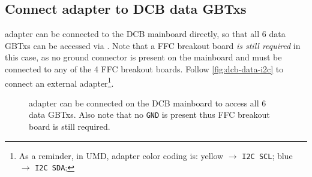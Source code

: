 \subsection{Connect \itwoc adapter to DCB data GBTxs}
\label{sec:dcb-data-i2c}
\itwoc adapter can be connected to the DCB mainboard directly, so that all 6
data GBTxs can be accessed via \itwoc.
Note that a FFC breakout board \emph{is still required} in this case, as no
ground connector is present on the mainboard and must be connected to any of the
4 FFC breakout boards.
Follow \autoref{fig:dcb-data-i2c} to connect an external \itwoc
adapter\footnote{
    As a reminder, in UMD, \itwoc adapter color coding is:
    yellow $\rightarrow$ \texttt{I2C SCL};
    blue $\rightarrow$ \texttt{I2C SDA};
}.

\begin{figure}[!ht]
\centering
{}
\caption{
    \itwoc adapter can be connected on the DCB mainboard to access all 6 data
    GBTxs.
    Also note that no \texttt{GND} is present thus FFC breakout board is still
    required.
}
\label{fig:dcb-data-i2c}
\end{figure}
